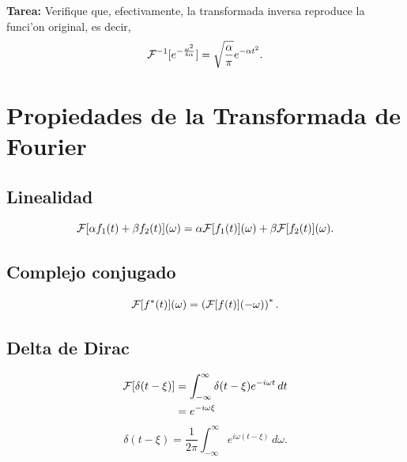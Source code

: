 \textbf{Tarea:} Verifique que, efectivamente, la transformada inversa reproduce la funci'on original, es decir,
\begin{equation}\label{Tfinvgauss}
{\cal F}^{-1}[e^{-\frac{\omega^2}{4\alpha}}]=\sqrt{\frac{\alpha}{\pi}}e^{-\alpha t^2}.
\end{equation}

\section{Propiedades de la Transformada de Fourier} 
\subsection{Linealidad}
\begin{equation}
{\cal F}[\alpha f_1(t)+\beta f_2(t)](\omega) = \alpha{\cal F}[f_1(t)](\omega)+\beta {\cal F}[f_2(t)](\omega).
\end{equation}
\subsection{Complejo conjugado}
\begin{equation}
{\cal F}[f^\ast(t)](\omega) = \left({\cal F}[f(t)](-\omega)\right)^\ast.
\end{equation}

\subsection{Delta de Dirac}
\begin{align}
{\cal F}[\delta(t-\xi)] 
 &=\int_{-\infty}^\infty\delta(t-\xi) e^{-i\omega t}\,dt 
\\
 &=e^{-i\omega\xi} \label{Fd}
\end{align}
\begin{equation}
\boxed{ 
\delta(t-\xi) =\frac{1}{2\pi}\int_{-\infty}^\infty e^{i\omega (t-\xi)}\,d\omega. 
 }
\end{equation}
%
